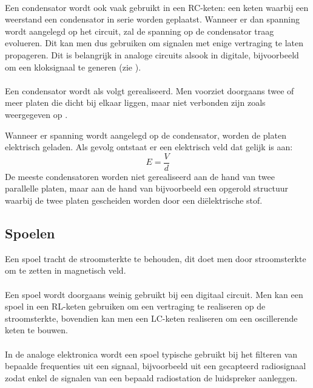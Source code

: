 \paragraph{}
Een condensator wordt ook vaak gebruikt in een RC-keten: een keten waarbij een weerstand een condensator in serie worden geplaatst. Wanneer er dan spanning wordt aangelegd op het circuit, zal de spanning op de condensator traag evolueren. Dit kan men dus gebruiken om signalen met enige vertraging te laten propageren. Dit is belangrijk in analoge circuits alsook in digitale, bijvoorbeeld om een kloksignaal te generen (zie ).
\paragraph{}
Een condensator wordt als volgt gerealiseerd. Men voorziet doorgaans twee of meer platen die dicht bij elkaar liggen, maar niet verbonden zijn zoals weergegeven op .


Wanneer er spanning wordt aangelegd op de condensator, worden de platen elektrisch geladen. Als gevolg ontstaat er een elektrisch veld dat gelijk is aan:
\begin{equation}
E=\dfrac{V}{d}
\end{equation}
De meeste condensatoren worden niet gerealiseerd aan de hand van twee parallelle platen, maar aan de hand van bijvoorbeeld een opgerold structuur waarbij de twee platen gescheiden worden door een di\"elektrische stof.
\subsection{Spoelen}
Een spoel tracht de stroomsterkte te behouden, dit doet men door stroomsterkte om te zetten in magnetisch veld.

\paragraph{}
Een spoel wordt doorgaans weinig gebruikt bij een digitaal circuit. Men kan een spoel in een RL-keten gebruiken om een vertraging te realiseren op de stroomsterkte, bovendien kan men een LC-keten realiseren om een oscillerende keten te bouwen.

\paragraph{}
In de analoge elektronica wordt een spoel typische gebruikt bij het filteren van bepaalde frequenties uit een signaal, bijvoorbeeld uit een gecapteerd radiosignaal zodat enkel de signalen van een bepaald radiostation de luidspreker aanleggen.

